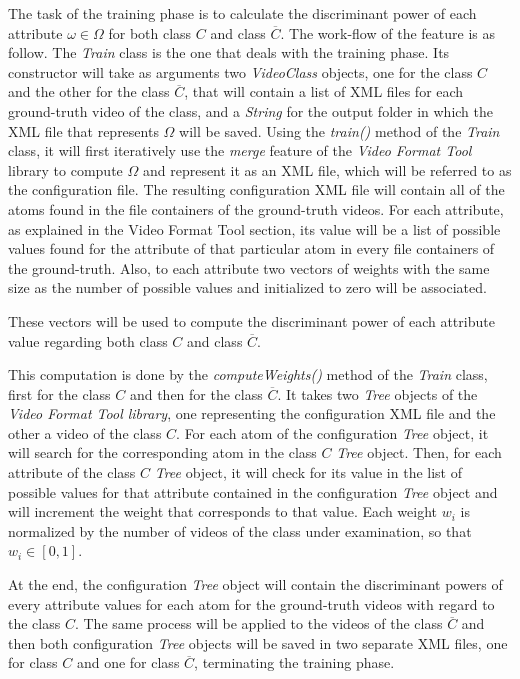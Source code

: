 The task of the training phase is to calculate the discriminant power of each attribute $\omega \in \Omega$ for both class $C$ and class $\overline{C}$. The work-flow of the feature is as follow. The \emph{Train} class is the one that deals with the training phase. Its constructor will take as arguments two \emph{VideoClass} objects, one for the class $C$ and the other for the class $\overline{C}$, that will contain a list of XML files for each ground-truth video of the class, and a \emph{String} for the output folder in which the XML file that represents $\Omega$ will be saved.
Using the \emph{train()} method of the \emph{Train} class, it will first iteratively use the \emph{merge} feature of the \emph{Video Format Tool} library to compute $\Omega$ and represent it as an XML file, which will be referred to as the configuration file. The resulting configuration XML file will contain all of the atoms found in the file containers of the ground-truth videos. For each attribute, as explained in the Video Format Tool section, its value will be a list of possible values found for the attribute of that particular atom in every file containers of the ground-truth. Also, to each attribute two vectors of weights with the same size as the number of possible values and initialized to zero will be associated. 

These vectors will be used to compute the discriminant power of each attribute value regarding both class $C$ and class $\overline{C}$.

This computation is done by the \emph{computeWeights()} method of the \emph{Train} class, first for the class $C$ and then for the class $\overline{C}$. It takes two \emph{Tree} objects of the \emph{Video Format Tool library}, one representing the configuration XML file and the other a video of the class $C$. For each atom of the configuration \emph{Tree} object, it will search for the corresponding atom in the class $C$ \emph{Tree} object. Then, for each attribute of the class $C$ \emph{Tree} object, it will check for its value in the list of possible values for that attribute contained in the configuration \emph{Tree} object and will increment the weight that corresponds to that value. Each weight $w_{i}$ is normalized by the number of videos of the class under examination, so that $w_{i} \in \left[0, 1\right] $.

At the end, the configuration \emph{Tree} object will contain the discriminant powers of every attribute values for each atom for the ground-truth videos with regard to the class $C$. The same process will be applied to the videos of the class $\overline{C}$ and then both configuration \emph{Tree} objects will be saved in two separate XML files, one for class $C$ and one for class $\overline{C}$, terminating the training phase.


